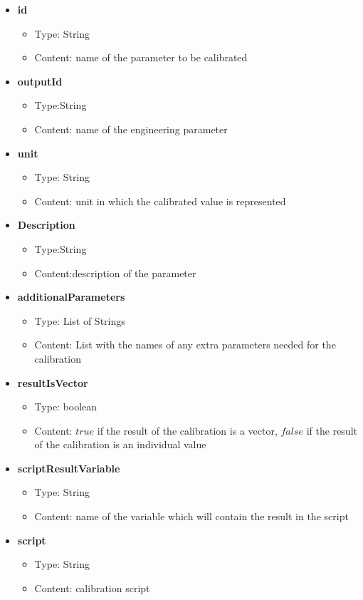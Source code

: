 \begin{itemize}

	\item \textbf{id}
		\begin{itemize}
			\item Type: String
			\item Content: name of the parameter to be calibrated
		\end{itemize}
	\item \textbf{outputId}
		\begin{itemize}
			\item Type:String
			\item Content: name of the engineering parameter
		\end{itemize}
	\item \textbf{unit}
		\begin{itemize}
			\item Type: String
			\item Content: unit in which the calibrated value is represented
		\end{itemize}
	\item \textbf{Description}
		\begin{itemize}
			\item Type:String
			\item Content:description of the parameter
		\end{itemize}
	
	\item \textbf{additionalParameters}
		\begin{itemize}
			\item Type: List of Strings
			\item Content: List with the names of any extra parameters needed for the calibration
		\end{itemize}
	\item \textbf{resultIsVector}
		\begin{itemize}
			\item Type: boolean
			\item Content: $true$ if the result of the calibration is a vector, $false$ if the result of the calibration is an individual value 
		\end{itemize}
	\item \textbf{scriptResultVariable}
		\begin{itemize}
			\item Type: String
			\item Content: name of the variable which will contain the result in the script
		\end{itemize}
	\item \textbf{script}
		\begin{itemize}
			\item Type: String
			\item Content: calibration script
		\end{itemize}						
		
\end{itemize}

